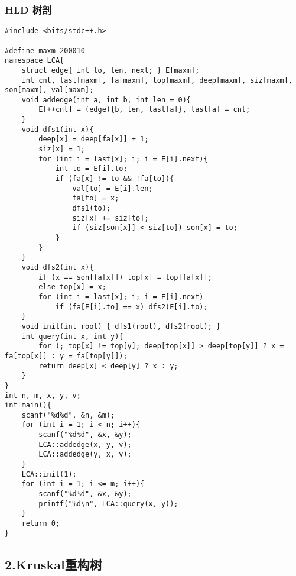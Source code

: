 \documentclass[]{article}
\begin{document}
\hypertarget{hld-ux6811ux5256}{%
\subsubsection{HLD 树剖}\label{hld-ux6811ux5256}}

\begin{verbatim}
#include <bits/stdc++.h>

#define maxm 200010
namespace LCA{
    struct edge{ int to, len, next; } E[maxm];
    int cnt, last[maxm], fa[maxm], top[maxm], deep[maxm], siz[maxm], son[maxm], val[maxm];
    void addedge(int a, int b, int len = 0){
        E[++cnt] = (edge){b, len, last[a]}, last[a] = cnt;
    }
    void dfs1(int x){
        deep[x] = deep[fa[x]] + 1;
        siz[x] = 1;
        for (int i = last[x]; i; i = E[i].next){
            int to = E[i].to;
            if (fa[x] != to && !fa[to]){
                val[to] = E[i].len;
                fa[to] = x;
                dfs1(to);
                siz[x] += siz[to];
                if (siz[son[x]] < siz[to]) son[x] = to;
            }
        }
    }
    void dfs2(int x){
        if (x == son[fa[x]]) top[x] = top[fa[x]];
        else top[x] = x;
        for (int i = last[x]; i; i = E[i].next)
            if (fa[E[i].to] == x) dfs2(E[i].to);
    }
    void init(int root) { dfs1(root), dfs2(root); }
    int query(int x, int y){
        for (; top[x] != top[y]; deep[top[x]] > deep[top[y]] ? x = fa[top[x]] : y = fa[top[y]]);
        return deep[x] < deep[y] ? x : y;
    }
}
int n, m, x, y, v;
int main(){
    scanf("%d%d", &n, &m);
    for (int i = 1; i < n; i++){
        scanf("%d%d", &x, &y);
        LCA::addedge(x, y, v);
        LCA::addedge(y, x, v);
    }
    LCA::init(1);
    for (int i = 1; i <= m; i++){
        scanf("%d%d", &x, &y);
        printf("%d\n", LCA::query(x, y));
    }
    return 0;
}
\end{verbatim}

\hypertarget{kruskalux91cdux6784ux6811}{%
\subsection{2.Kruskal重构树}\label{kruskalux91cdux6784ux6811}}
\end{document}
